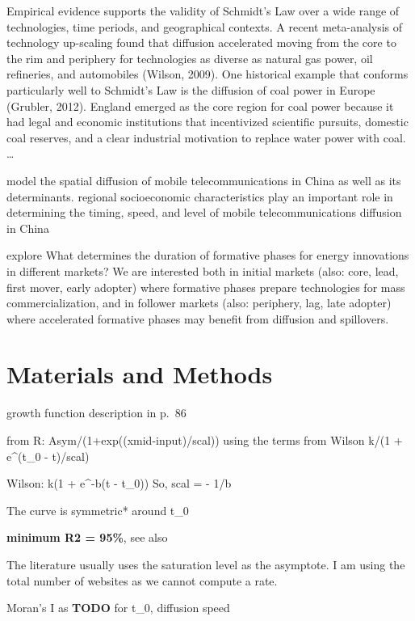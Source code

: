 \documentclass[preprint, 3p,
authoryear]{elsarticle} %
\begin{document}
\citet{leibowicz2016representing} Empirical evidence supports the
validity of Schmidt's Law over a wide range of technologies, time
periods, and geographical contexts. A recent meta-analysis of technology
up-scaling found that diffusion accelerated moving from the core to the
rim and periphery for technologies as diverse as natural gas power, oil
refineries, and automobiles (Wilson, 2009). One historical example that
conforms particularly well to Schmidt's Law is the diffusion of coal
power in Europe (Grubler, 2012). England emerged as the core region for
coal power because it had legal and economic institutions that
incentivized scientific pursuits, domestic coal reserves, and a clear
industrial motivation to replace water power with coal. \ldots{}

\citet{ding2010modeling} model the spatial diffusion of mobile
telecommunications in China as well as its determinants. regional
socioeconomic characteristics play an important role in determining the
timing, speed, and level of mobile telecommunications diffusion in China

\citet{bento2018time} explore What determines the duration of formative
phases for energy innovations in different markets? We are interested
both in initial markets (also: core, lead, first mover, early adopter)
where formative phases prepare technologies for mass commercialization,
and in follower markets (also: periphery, lag, late adopter) where
accelerated formative phases may benefit from diffusion and spillovers.

\hypertarget{sec3}{%
\section{Materials and Methods}\label{sec3}}

\citet{wilson201281} growth function description in p.~86

from R: Asym/(1+exp((xmid-input)/scal)) using the terms from Wilson k/(1
+ e\^{}(t\_0 - t)/scal)

Wilson: k(1 + e\^{}-b(t - t\_0)) So, scal = - 1/b

The curve is symmetric* around t\_0

\textbf{minimum R2 = 95\%}, see also \citet{grubler1990rise}

The literature usually uses the saturation level as the asymptote. I am
using the total number of websites as we cannot compute a rate.

Moran's I as \citet{ding2010modeling} \textbf{TODO} for t\_0, diffusion
speed
\end{document}
